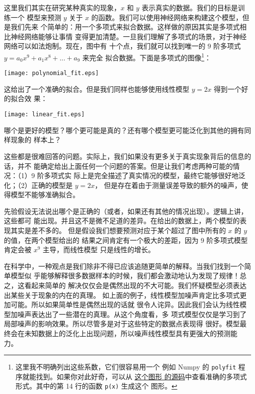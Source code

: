 这里我们其实在研究某种真实的现象，$x$ 和 $y$ 表示真实的数据。我们的目标是训练一个
模型来预测 $y$ 关于 $x$ 的函数。我们可以使用神经网络来构建这个模型，但是我们先来
个简单的：用一个多项式来拟合数据。这样做的原因其实是多项式相比神经网络能够让事情
变得更加清楚。一旦我们理解了多项式的场景，对于神经网络可以如法炮制。现在，图中有
十个点，我们就可以找到唯一的 $9$ 阶多项式 $y=a_0x^9 + a_1x^8 + ... + a_9$ 来完全
拟合数据。下面是多项式的图像\footnote{这里我不明确列出这些系数，它们很容易用一个
  例如 Numpy 的 \lstinline!polyfit! 程序就能找到。如果你对此好奇，可以从%
  \href{http://neuralnetworksanddeeplearning.com/js/polynomial_model.js}{这个图形
    的源码}中查看准确的多项式形式。其中的第 14 行的函数 \lstinline!p(x)! 生成这个
  图形。}：
\begin{center}
  \texttt{[image: polynomial\_fit.eps]}
\end{center}

这给出了一个准确的拟合。但是我们同样也能够使用线性模型 $y=2x$ 得到一个好的拟合效
果：
\begin{center}
  \texttt{[image: linear\_fit.eps]}
\end{center}

哪个是更好的模型？哪个更可能是真的？还有哪个模型更可能泛化到其他的拥有同样现象的
样本上？

这些都是很难回答的问题。实际上，我们如果没有更多关于真实现象背后的信息的话，并不
能确定给出上面任何一个问题的答案。但是让我们考虑两种可能的情况：（1）9 阶多项式实
际上是完全描述了真实情况的模型，最终它能够很好地泛化；（2）正确的模型是 $y=2x$，
但是存在着由于测量误差导致的额外的噪声，使得模型不能够准确拟合。

先验假设无法说出哪个是正确的（或者，如果还有其他的情况出现）。逻辑上讲，这些都可
能出现。并且这不是微不足道的差异。在给出的数据上，两个模型的表现其实是差不多的。
但是假设我们想要预测对应于某个超过了图中所有的 $x$ 的 $y$ 的值，在两个模型给出的
结果之间肯定有一个极大的差距，因为 9 阶多项式模型肯定会被 $x^9$ 主导，而线性模型
只是线性的增长。

在科学中，一种观点是我们除非不得已应该追随更简单的解释。当我们找到一个简单模型似
乎能够解释很多数据样本的时候，我们都会激动地认为发现了规律！总之，这看起来简单的
解决仅仅会是偶然出现的不大可能。我们怀疑模型必须表达出某些关于现象的内在的真理。
如上面的例子，线性模型加噪声肯定比多项式更加可能。所以如果简单性是偶然出现的话就
很令人诧异。因此我们会认为线性模型加噪声表达出了一些潜在的真理。从这个角度看，多
项式模型仅仅是学习到了局部噪声的影响效果。所以尽管多是对于这些特定的数据点表现得
很好。模型最终会在未知数据上的泛化上出现问题，所以噪声线性模型具有更强大的预测能
力。

